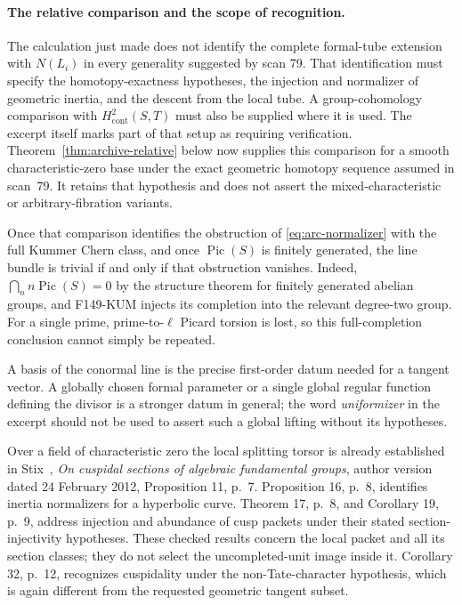 \paragraph{The relative comparison and the scope of recognition.}
The calculation just made does not identify the complete formal-tube
extension with \(N(L_i)\) in every generality suggested by scan 79.
That identification must specify the homotopy-exactness hypotheses,
the injection and normalizer of geometric inertia, and the descent
from the local tube.  A group-cohomology comparison with
\(H^2_{\mathrm{cont}}(S,T)\) must also be supplied where it is used.
The excerpt itself marks part of that setup as requiring verification.
Theorem~\ref{thm:archive-relative} below now supplies this comparison for a smooth characteristic-zero base under the exact geometric homotopy sequence assumed in scan~79. It retains that hypothesis and does not assert the mixed-characteristic or arbitrary-fibration variants.

Once that comparison identifies the obstruction of
\eqref{eq:arc-normalizer} with the full Kummer Chern class, and once
\(\operatorname{Pic}(S)\) is finitely generated, the line bundle is
trivial if and only if that obstruction vanishes.  Indeed,
\(\bigcap_n n\operatorname{Pic}(S)=0\) by the structure theorem for
finitely generated abelian groups, and F149-KUM injects its completion
into the relevant degree-two group.  For a single prime, prime-to-\(\ell\)
Picard torsion is lost, so this full-completion conclusion cannot
simply be repeated.

A basis of the conormal line is the precise first-order datum needed
for a tangent vector.  A globally chosen formal parameter or a single
global regular function defining the divisor is a stronger datum in
general; the word \emph{uniformizer} in the excerpt should not be used
to assert such a global lifting without its hypotheses.

Over a field of characteristic zero the local splitting torsor is
already established in Stix~\cite{StixCuspidal2012}, \emph{On cuspidal sections of algebraic
fundamental groups}, author version dated 24 February 2012,
Proposition 11, p.~7.  Proposition 16, p.~8, identifies inertia
normalizers for a hyperbolic curve.  Theorem 17, p.~8, and Corollary 19,
p.~9, address injection and abundance of cusp packets under their
stated section-injectivity hypotheses.  These checked results concern
the local packet and all its section classes; they do not select the
uncompleted-unit image inside it.  Corollary 32, p.~12, recognizes
cuspidality under the non-Tate-character hypothesis, which is again
different from the requested geometric tangent subset.

